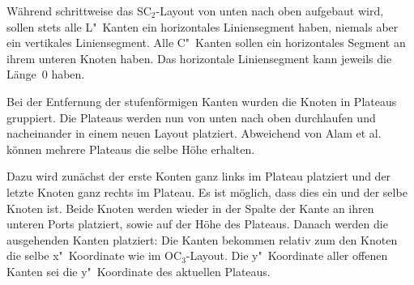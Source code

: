 \documentclass[a4paper]{scrreprt}
\theoremstyle{definition}
\begin{document}
Während schrittweise das SC$_2$-Layout von unten nach oben aufgebaut wird, sollen stets alle L"~Kanten ein horizontales Liniensegment haben, niemals aber ein vertikales Liniensegment. Alle C"~Kanten sollen ein horizontales Segment an ihrem unteren Knoten haben. Das horizontale Liniensegment kann jeweils die Länge~0 haben.

Bei der Entfernung der stufenförmigen Kanten wurden die Knoten in Plateaus gruppiert. Die Plateaus werden nun von unten nach oben durchlaufen und nacheinander in einem neuen Layout platziert. Abweichend von Alam et al.~\cite{smooth-13} können mehrere Plateaus die selbe Höhe erhalten.

Dazu wird zunächst der erste Konten ganz links im Plateau platziert und der letzte Knoten ganz rechts im Plateau. Es ist möglich, dass dies ein und der selbe Knoten ist. Beide Knoten werden wieder in der Spalte der Kante an ihren unteren Ports platziert, sowie auf der Höhe des Plateaus. Danach werden die ausgehenden Kanten platziert: Die Kanten bekommen relativ zum den Knoten die selbe x"~Koordinate wie im OC$_3$-Layout. Die y"~Koordinate aller offenen Kanten sei die y"~Koordinate des aktuellen Plateaus. 
\end{document}
